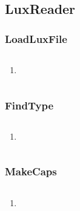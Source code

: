 \documentclass{subfiles}
\begin{document}
\subsection{LuxReader}
\newpage
\subsubsection{LoadLuxFile}
\begin{lstlisting}

\end{lstlisting}
\begin{enumerate}
	\item
\end{enumerate}
\begin{lstlisting}

\end{lstlisting}
\newpage
\subsubsection{FindType}
\begin{lstlisting}

\end{lstlisting}
\begin{enumerate}
	\item
\end{enumerate}
\begin{lstlisting}

\end{lstlisting}
\newpage
\subsubsection{MakeCaps}
\begin{lstlisting}

\end{lstlisting}
\begin{enumerate}
	\item
\end{enumerate}
\begin{lstlisting}

\end{lstlisting}
\newpage
\end{document}
